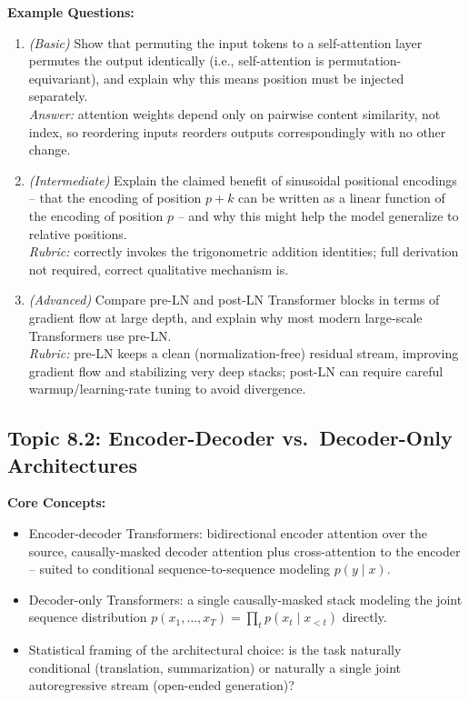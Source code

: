 \documentclass[11pt]{article}
\begin{document}
\textbf{Example Questions:}
\begin{enumerate}
  \item \textit{(Basic)} Show that permuting the input tokens to a self-attention layer permutes the output identically (i.e., self-attention is permutation-equivariant), and explain why this means position must be injected separately. \\
  \textit{Answer:} attention weights depend only on pairwise content similarity, not index, so reordering inputs reorders outputs correspondingly with no other change.
  \item \textit{(Intermediate)} Explain the claimed benefit of sinusoidal positional encodings -- that the encoding of position $p+k$ can be written as a linear function of the encoding of position $p$ -- and why this might help the model generalize to relative positions. \\
  \textit{Rubric:} correctly invokes the trigonometric addition identities; full derivation not required, correct qualitative mechanism is.
  \item \textit{(Advanced)} Compare pre-LN and post-LN Transformer blocks in terms of gradient flow at large depth, and explain why most modern large-scale Transformers use pre-LN. \\
  \textit{Rubric:} pre-LN keeps a clean (normalization-free) residual stream, improving gradient flow and stabilizing very deep stacks; post-LN can require careful warmup/learning-rate tuning to avoid divergence.
\end{enumerate}

\subsection{Topic 8.2: Encoder-Decoder vs.\ Decoder-Only Architectures}

\textbf{Core Concepts:}
\begin{itemize}
  \item Encoder-decoder Transformers: bidirectional encoder attention over the source, causally-masked decoder attention plus cross-attention to the encoder -- suited to conditional sequence-to-sequence modeling $p(y \mid x)$.
  \item Decoder-only Transformers: a single causally-masked stack modeling the joint sequence distribution $p(x_1,\ldots,x_T) = \prod_t p(x_t \mid x_{<t})$ directly.
  \item Statistical framing of the architectural choice: is the task naturally conditional (translation, summarization) or naturally a single joint autoregressive stream (open-ended generation)?
\end{itemize}
\end{document}
